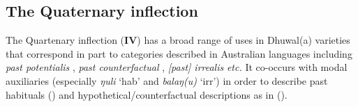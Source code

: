%
%
%


\subsection{The Quaternary inflection}\label{desc-iv}


The Quartenary inflection (\textbf{IV}) has a broad range of uses in Dhuwal(a) varieties that correspond in part to categories described in Australian languages including \textit{past potentialis} \citep{Heath1980a}, \textit{past counterfactual} \cite{McKay2011}, \textit{[past] irrealis} \citep[159]{Austin1998} \textit{etc.} It co-occurs with modal auxiliaries (especially \textit{ŋuli} `\gls{hab}' and \textit{balaŋ(u)} `\gls{irr}') in order to describe past habituals () and hypothetical/counterfactual descriptions as in ().


